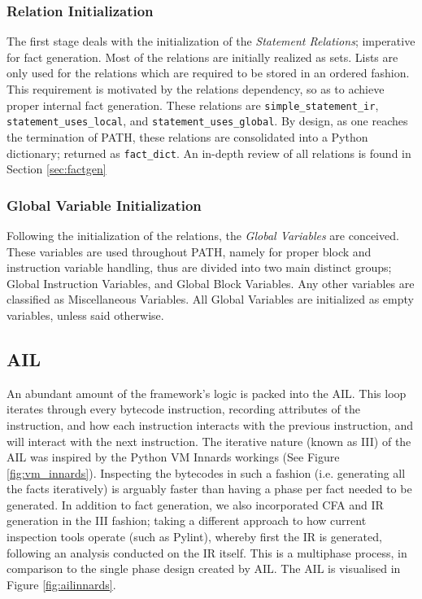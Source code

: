             \subsubsection*{Relation Initialization}
            \par The first stage deals with the initialization of the \textit{Statement Relations}; imperative for fact generation.
            Most of the relations are initially realized as sets. Lists are only used for the relations which are required to be stored in an ordered fashion. This requirement is motivated 
            by the relations dependency, so as to achieve proper internal fact generation. These relations are \lstinline{simple_statement_ir}, \lstinline{statement_uses_local}, and \lstinline{statement_uses_global}.
            By design, as one reaches the termination of \acs{PATH}, these relations are consolidated into a Python dictionary; returned as \lstinline{fact_dict}. An in-depth review of all relations is found in Section \ref{sec:factgen}

            \subsubsection*{Global Variable Initialization}
            \par Following the initialization of the relations, the \textit{Global Variables} are conceived. These variables are used throughout \acs{PATH}, namely for proper block and instruction variable handling, thus
            are divided into two main distinct groups; Global Instruction Variables, and Global Block Variables. Any other variables are classified as Miscellaneous Variables. All Global Variables are initialized as empty variables, unless said otherwise.

        \subsection{\acs{AIL}}
        \label{subsec:AILimp}
        \par An abundant amount of the framework's logic is packed into the \acs{AIL}. This loop iterates through every bytecode instruction, recording attributes of the instruction, and how 
        each instruction interacts with the previous instruction, and will interact with the next instruction. The iterative nature (known as \acs{III}) of the \acs{AIL} was inspired by the Python VM Innards workings (See Figure \ref{fig:vm_innards}). Inspecting the bytecodes in such a fashion (i.e. generating all the facts iteratively) is arguably faster than having 
        a phase per fact needed to be generated. In addition to fact generation, we also incorporated \acs{CFA} and \acs{IR} generation in the \acs{III} fashion; taking a different approach to how current inspection tools operate (such as Pylint), whereby first the \acs{IR} is generated, following an analysis conducted on the \acs{IR} itself. This is a multiphase process, in comparison to the single phase 
        design created by \acs{AIL}. The \acs{AIL} is visualised in Figure \ref{fig:ailinnards}.
